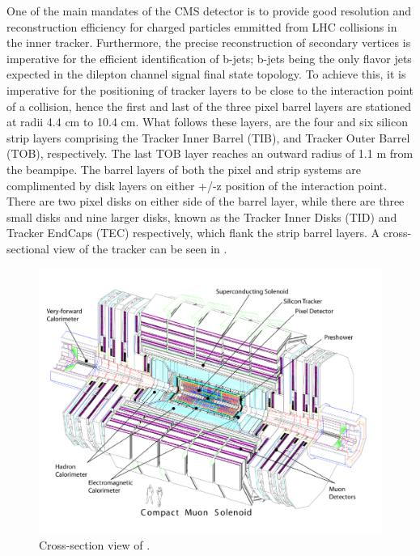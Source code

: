 \vspace{1cm}

One of the main mandates of the CMS detector is to provide good resolution and reconstruction efficiency for charged particles emmitted from LHC collisions in the inner tracker. Furthermore, the precise reconstruction of secondary vertices is imperative for the efficient identification of b-jets; b-jets being the only flavor jets expected in the dilepton channel \ttDM signal final state topology. To achieve this, it is imperative for the positioning of tracker layers to be close to the interaction point of a collision, hence the first and last of the three pixel barrel layers are stationed at radii 4.4 cm to 10.4 cm. What follows these layers, are the four and six silicon strip layers comprising the Tracker Inner Barrel (TIB), and Tracker Outer Barrel (TOB), respectively. The last TOB layer reaches an outward radius of 1.1 m from the beampipe. The barrel layers of both the pixel and strip systems are complimented by disk layers on either +/-z position of the interaction point. There are two pixel disks on either side of the barrel layer, while there are three small disks and nine larger disks, known as the Tracker Inner Disks (TID) and Tracker EndCaps (TEC) respectively, which flank the strip barrel layers. A cross-sectional view of the tracker can be seen in . 
 

\begin{figure}
  \begin{center}
  \includegraphics[width=0.8\textheight]{figs/CMScrosssection.pdf}
  \caption[Cross-section view of \CMS]%
    {Cross-section view of \CMS.}
  \label{fig:CMSCrossSection}
  \end{center}
\end{figure}

